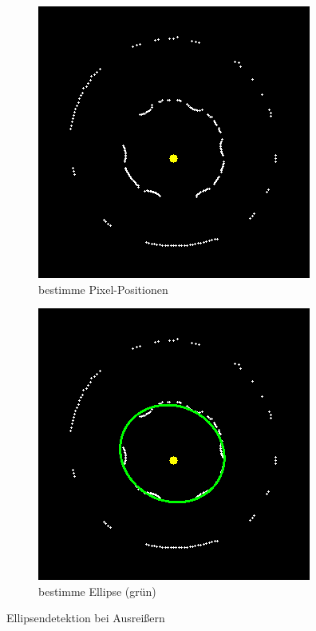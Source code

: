 \begin{figure}[!htb]
	\centering
	\begin{subfigure}{.5\textwidth}
		\centering
		\includegraphics[scale=.6]{images/rayCastRobust.png}
		\caption{bestimme Pixel-Positionen}
		\label{fig:rayCastRWOE}
	\end{subfigure}%
	\begin{subfigure}{.5\textwidth}
		\centering
		\includegraphics[scale=.6]{images/rayCastRobustEllipse.png}
		\caption{bestimme Ellipse (grün)}
		\label{fig:rayCastRWE}
	\end{subfigure}
	\caption{Ellipsendetektion bei Ausreißern}
	\label{fig:rayCastR}
\end{figure}



